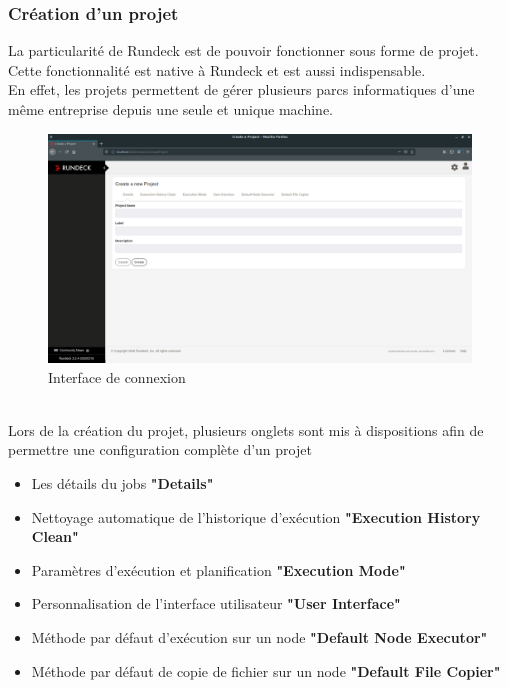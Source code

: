 \documentclass[12pt]{article}
\begin{document}
\subsubsection{Création d'un projet}
La particularité de Rundeck est de pouvoir fonctionner sous forme de projet. Cette fonctionnalité est native à Rundeck et est aussi indispensable.
\\
En effet, les projets permettent de gérer plusieurs parcs informatiques d'une même entreprise depuis une seule et unique machine.
\\
\begin{figure}[ht]
    \includegraphics[scale=0.23]{images/project.png}
    \caption{Interface de connexion}
\end{figure}
\\
Lors de la création du projet, plusieurs onglets sont mis à dispositions afin de permettre une configuration complète d'un projet
\\
\begin{itemize}
    \item Les détails du jobs \textbf{"Details"}
    \item Nettoyage automatique de l'historique d'exécution \textbf{"Execution History Clean"}
    \item Paramètres d'exécution et planification \textbf{"Execution Mode"}
    \item Personnalisation de l'interface utilisateur \textbf{"User Interface"}
    \item Méthode par défaut d'exécution sur un node \textbf{"Default Node Executor"}
    \item Méthode par défaut de copie de fichier sur un node \textbf{"Default File Copier"}
\end{itemize}
\\
\vspace{0.5cm}
\\
\end{document}
